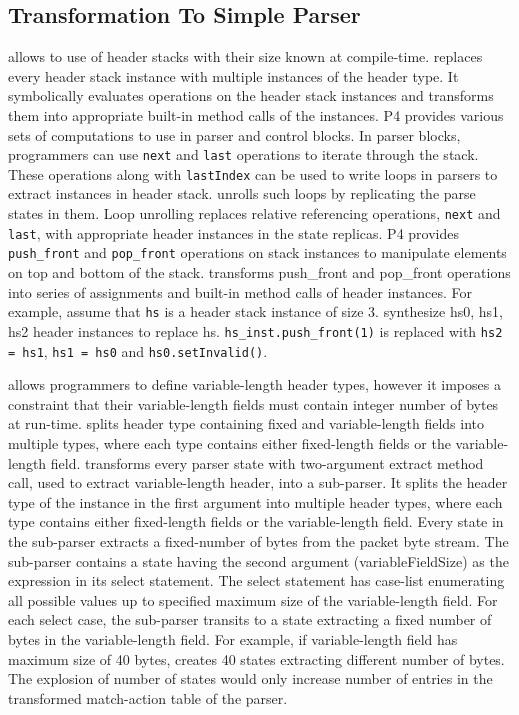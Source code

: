 \documentclass[letterpaper,twocolumn,10pt]{article}
\begin{document}
\subsection{Transformation To Simple Parser}
\label{subsection:header-stacks-variable-length-headers}
\ulang allows to use of header stacks with their size known at 
compile-time. 
\ucomp replaces every header stack instance with multiple instances of 
the header type. 
It symbolically evaluates operations on the header stack instances and 
transforms them into appropriate built-in method calls of the 
instances.
P4 provides various sets of computations to use in parser and control 
blocks.
In parser blocks, programmers can use \texttt{next} and \texttt{last} 
operations to iterate through the stack.
These operations along with \texttt{lastIndex} can be used to write 
loops in parsers to extract instances in header stack.
\ucomp unrolls such loops by replicating the parse states in them.
Loop unrolling replaces relative referencing operations, \texttt{next} 
and \texttt{last}, with appropriate header instances in the state 
replicas.
P4 provides \texttt{push\_front} and \texttt{pop\_front} operations on 
stack instances to manipulate elements on top and bottom of the stack.
\ucomp transforms push\_front and pop\_front operations into series of 
assignments and built-in method calls of header instances.
For example, assume that \texttt{hs} is a header stack instance of 
size 3. 
\ucomp synthesize hs0, hs1, hs2 header instances to replace hs.
\texttt{hs\_inst.push\_front(1)} is replaced with \texttt{hs2 = hs1}, 
\texttt{hs1 = hs0} and \texttt{hs0.setInvalid()}.


\ulang allows programmers to define variable-length header types, 
however it imposes a constraint that their variable-length fields must 
contain integer number of bytes at run-time.
\ucomp splits header type containing fixed and variable-length 
fields into multiple types, where each type contains either 
fixed-length fields or the variable-length field.
\ucomp transforms every parser state with two-argument extract method 
call, used to extract variable-length header, into a sub-parser.
It splits the header type of the instance in the first argument into 
multiple header types, where each type contains either fixed-length 
fields or 
the variable-length field.
Every state in the sub-parser extracts a fixed-number of bytes from 
the packet byte stream.
The sub-parser contains a state having the second argument 
(variableFieldSize) as the expression in its select statement.
The select statement has case-list enumerating all possible values up 
to specified maximum size of the variable-length field.
For each select case, the sub-parser transits to a state extracting a 
fixed number of bytes in the variable-length field.
For example, if variable-length field has maximum size of 40 bytes, 
\ucomp creates 40 states extracting different number of bytes.
The explosion of number of states would only increase number of 
entries in the transformed match-action table of the parser.
\end{document}
